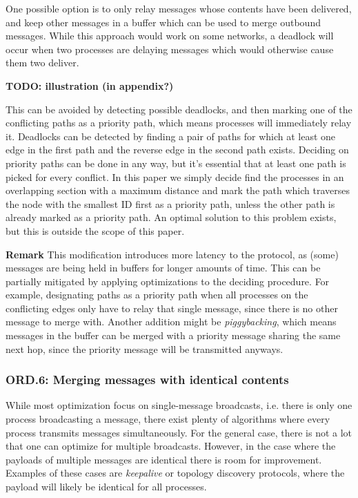 One possible option is to only relay messages whose contents have been delivered, and keep other messages in a buffer which can be used to merge outbound messages. While this approach would work on some networks, a deadlock will occur when two processes are delaying messages which would otherwise cause them two deliver.

\textbf{TODO: illustration (in appendix?)}

This can be avoided by detecting possible deadlocks, and then marking one of the conflicting paths as a priority path, which means processes will immediately relay it. Deadlocks can be detected by finding a pair of paths for which at least one edge in the first path and the reverse edge in the second path exists. Deciding on priority paths can be done in any way, but it's essential that at least one path is picked for every conflict. In this paper we simply decide find the processes in an overlapping section with a maximum distance and mark the path which traverses the node with the smallest ID first as a priority path, unless the other path is already marked as a priority path. An optimal solution to this problem exists, but this is outside the scope of this paper.

\textbf{Remark}
This modification introduces more latency to the protocol, 
as (some) messages are being held in buffers for longer amounts of time. This can be partially mitigated by applying optimizations to the deciding procedure. For example, designating paths as a priority path when all processes on the conflicting edges only have to relay that single message, since there is no other message to merge with. Another addition might be \textit{piggybacking}, which means messages in the buffer can be merged with a priority message sharing the same next hop, since the priority message will be transmitted anyways.



\subsubsection{ORD.6: Merging messages with identical contents}
While most optimization focus on single-message broadcasts, i.e. there is only one process broadcasting a message, there exist plenty of algorithms where every process transmits messages simultaneously. For the general case, there is not a lot that one can optimize for multiple broadcasts. However, in the case where the payloads of multiple messages are identical there is room for improvement. Examples of these cases are \textit{keepalive} or topology discovery protocols, where the payload will likely be identical for all processes. 

